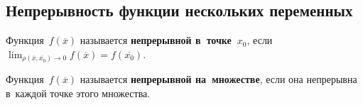 \subsection{Непрерывность функции нескольких переменных}
Функция~$f(\overline x)$ называется \textbf{непрерывной в~точке~$x_0$}, если $\lim_{\rho(\overline x, \overline{x_0}) \to 0} f(\overline x) = f(\overline{x_0})$.

Функция~$f(\overline x)$ называется \textbf{непрерывной на~множестве}, если она непрерывна в~каждой точке этого множества.